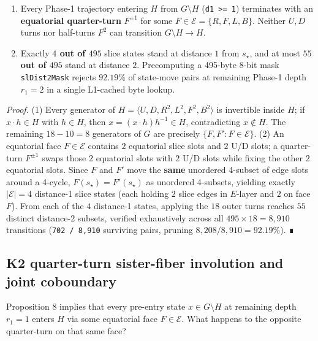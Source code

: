 \documentclass[10pt,twocolumn,letterpaper]{article}
\providecommand{\tightlist}{\setlength{\itemsep}{0pt}\setlength{\parskip}{0pt}}
\begin{document}
\begin{enumerate}
\def\labelenumi{\arabic{enumi}.}
\tightlist
\item
  Every Phase-1 trajectory entering \(H\) from \(G \setminus H\)
  (\texttt{d1\ \textgreater{}=\ 1}) terminates with an
  \textbf{equatorial quarter-turn} \(F^{\pm 1}\) for some
  \(F \in \mathcal E = \{R, F, L, B\}\). Neither \(U, D\) turns nor
  half-turns \(F^2\) can transition \(G \setminus H \to H\).
\item
  Exactly \textbf{\(4\) out of \(495\)} slice states stand at distance
  \(1\) from \(s_\star\), and at most \textbf{\(55\) out of \(495\)}
  stand at distance \(2\). Precomputing a 495-byte 8-bit mask
  \texttt{slDist2Mask} rejects \(92.19\%\) of state-move pairs at
  remaining Phase-1 depth \(r_1 = 2\) in a single L1-cached byte lookup.
\end{enumerate}

\emph{Proof.} (1) Every generator of
\(H = \langle U, D, R^2, L^2, F^2, B^2 \rangle\) is invertible inside
\(H\); if \(x \cdot h \in H\) with \(h \in H\), then
\(x = (x \cdot h) h^{-1} \in H\), contradicting \(x \notin H\). The
remaining \(18 - 10 = 8\) generators of \(G\) are precisely
\(\{F, F' : F \in \mathcal E\}\). (2) An equatorial face
\(F \in \mathcal E\) contains \(2\) equatorial slice slots and \(2\) U/D
slots; a quarter-turn \(F^{\pm 1}\) swaps those \(2\) equatorial slots
with \(2\) U/D slots while fixing the other \(2\) equatorial slots.
Since \(F\) and \(F'\) move the \textbf{same} unordered 4-subset of edge
slots around a 4-cycle, \(F(s_\star) = F'(s_\star)\) as unordered
4-subsets, yielding exactly \(|\mathcal E| = 4\) distance-1 slice states
(each holding \(2\) slice edges in \(E\)-layer and \(2\) on face \(F\)).
From each of the \(4\) distance-1 states, applying the \(18\) outer
turns reaches \(55\) distinct distance-2 subsets, verified exhaustively
across all \(495 \times 18 = 8,910\) transitions (\texttt{702\ /\ 8,910}
surviving pairs, pruning \(8,208 / 8,910 = 92.19\%\)). ∎

\hypertarget{k2-quarter-turn-sister-fiber-involution-and-joint-coboundary}{%
\subsection{K2 quarter-turn sister-fiber involution and joint coboundary}\label{k2-quarter-turn-sister-fiber-involution-and-joint-coboundary}}

Proposition 8 implies that every pre-entry state \(x \in G \setminus H\)
at remaining depth \(r_1 = 1\) enters \(H\) via some equatorial face
\(F \in \mathcal E\). What happens to the opposite quarter-turn on that
same face?
\end{document}
